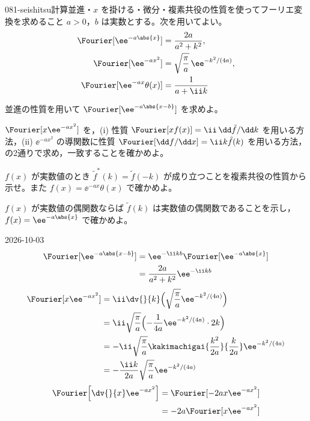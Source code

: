 \documentclass[uplatex,dvipdfmx,a4paper,11pt]{jsarticle}
\begin{document}
\begin{mondai}{081-seishitsu}{計算}{並進・$x$ を掛ける・微分・複素共役の性質を使ってフーリエ変換を求めること}
$a>0$，$b$ は実数とする。次を用いてよい。
  \begin{align*}
    \Fourier[\ee^{-a\abs{x}}]&=\frac{2a}{a^{2}+k^{2}},\\
    \Fourier[\ee^{-ax^{2}}]&=\sqrt{\frac{\pi}{a}}\,\ee^{-k^{2}/(4a)},\\
    \Fourier[\ee^{-ax}\theta(x)]&=\frac{1}{a+\ii k}
  \end{align*}
  \begin{shoumon}
    \item 並進の性質を用いて $\Fourier[\ee^{-a\abs{x-b}}]$ を求めよ。
    \item $\Fourier[x\ee^{-ax^{2}}]$ を，(i) 性質 $\Fourier[xf(x)]=\ii\,\dd\tilde f/\dd k$ を用いる方法，(ii) $\ee^{-ax^{2}}$ の導関数に性質 $\Fourier[\dd f/\dd x]=\ii k\tilde f(k)$ を用いる方法，の2通りで求め，一致することを確かめよ。
    \item $f(x)$ が実数値のとき $\tilde f^{*}(k)=\tilde f(-k)$ が成り立つことを複素共役の性質から示せ。また $f(x)=\ee^{-ax}\theta(x)$ で確かめよ。
    \item $f(x)$ が実数値の偶関数ならば $\tilde f(k)$ は実数値の偶関数であることを示し，$f(x)=\ee^{-a\abs{x}}$ で確かめよ。
  \end{shoumon}
\begin{kotaeutsushi}{2026-10-03}
\begin{align*}
  \Fourier[\ee^{-a\abs{x-b}}]&=\ee^{-\ii kb}\Fourier[\ee^{-a\abs{x}}]\\
  &=\frac{2a}{a^{2}+k^{2}}\ee^{-\ii kb}
\end{align*}
\begin{align*}
  \Fourier[x\ee^{-ax^{2}}]&=\ii\dv{}{k}\Bigl(\sqrt{\frac{\pi}{a}}\ee^{-k^{2}/(4a)}\Bigr)\\
  &=\ii\sqrt{\frac{\pi}{a}}\Bigl(-\frac{1}{4a}\ee^{-k^{2}/(4a)}\cdot2k\Bigr)\\
  &=-\ii\sqrt{\frac{\pi}{a}}\kakimachigai{\frac{k^{2}}{2a}}{\frac{k}{2a}}\ee^{-k^{2}/(4a)}\\
  &=-\frac{\ii k}{2a}\sqrt{\frac{\pi}{a}}\ee^{-k^{2}/(4a)}
\end{align*}
\begin{align*}
  \Fourier\Bigl[\dv{}{x}\ee^{-ax^{2}}\Bigr]&=\Fourier[-2ax\ee^{-ax^{2}}]\\
  &=-2a\Fourier[x\ee^{-ax^{2}}]\\

\end{align*}
\end{kotaeutsushi}
\end{mondai}
\end{document}
